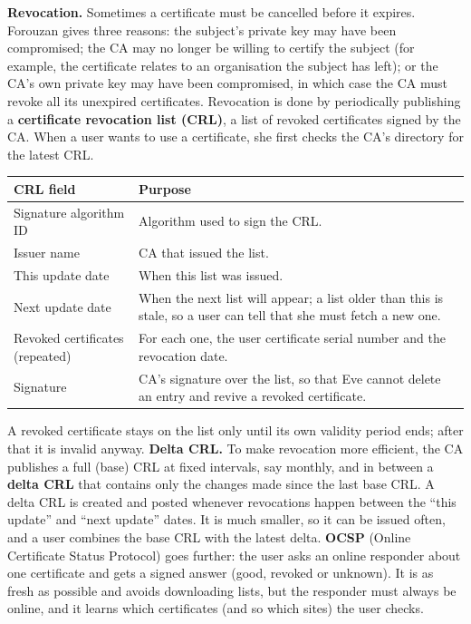 \textbf{Revocation.} Sometimes a certificate must be cancelled before it expires. Forouzan gives three reasons: the subject's private key may have been compromised; the CA may no longer be willing to certify the subject (for example, the certificate relates to an organisation the subject has left); or the CA's own private key may have been compromised, in which case the CA must revoke all its unexpired certificates. Revocation is done by periodically publishing a \textbf{certificate revocation list (CRL)}, a list of revoked certificates signed by the CA. When a user wants to use a certificate, she first checks the CA's directory for the latest CRL.
\begin{center}\small
\begin{tabularx}{\textwidth}{@{}l>{\raggedright\arraybackslash}X@{}}
\toprule
CRL field & Purpose\\
\midrule
Signature algorithm ID & Algorithm used to sign the CRL.\\
Issuer name & CA that issued the list.\\
This update date & When this list was issued.\\
Next update date & When the next list will appear; a list older than this is stale, so a user can tell that she must fetch a new one.\\
Revoked certificates (repeated) & For each one, the user certificate serial number and the revocation date.\\
Signature & CA's signature over the list, so that Eve cannot delete an entry and revive a revoked certificate.\\
\bottomrule
\end{tabularx}
\end{center}
A revoked certificate stays on the list only until its own validity period ends; after that it is invalid anyway. \textbf{Delta CRL.} To make revocation more efficient, the CA publishes a full (base) CRL at fixed intervals, say monthly, and in between a \textbf{delta CRL} that contains only the changes made since the last base CRL. A delta CRL is created and posted whenever revocations happen between the ``this update'' and ``next update'' dates. It is much smaller, so it can be issued often, and a user combines the base CRL with the latest delta. \textbf{OCSP} (Online Certificate Status Protocol) goes further: the user asks an online responder about one certificate and gets a signed answer (good, revoked or unknown). It is as fresh as possible and avoids downloading lists, but the responder must always be online, and it learns which certificates (and so which sites) the user checks.

